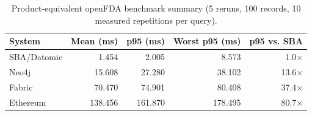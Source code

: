 \begin{table}[t]
\centering
\caption{Product-equivalent openFDA benchmark summary (5 reruns, 100 records, 10 measured repetitions per query).}
\label{tab:openfda-product-equivalent}
\begin{tabular}{lrrrr}
\toprule
System & Mean (ms) & p95 (ms) & Worst p95 (ms) & p95 vs. SBA \\
\midrule
SBA/Datomic & 1.454 & 2.005 & 8.573 & 1.0$\times$ \\
Neo4j & 15.608 & 27.280 & 38.102 & 13.6$\times$ \\
Fabric & 70.470 & 74.901 & 80.408 & 37.4$\times$ \\
Ethereum & 138.456 & 161.870 & 178.495 & 80.7$\times$ \\
\bottomrule
\end{tabular}
\end{table}
